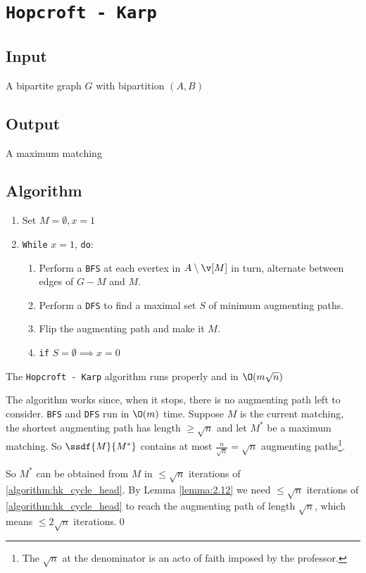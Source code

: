 \section{\texttt{Hopcroft - Karp}}
\subsection{Input}
    A bipartite graph $G$ with bipartition $(A, B)$
\subsection{Output}
    A maximum matching
\subsection{Algorithm}
\begin{enumerate}
    \item Set $M = \emptyset, x = 1$
    \item \label{algorithm:hk_cycle_head}\texttt{While} $x = 1$, \texttt{do}:
    \begin{enumerate}[label = \Alph*]
        \item Perform a \texttt{BFS} at each evertex in $A \setminus \v[M]$ in turn, alternate between edges of $G - M$ and $M$.
        \item Perform a \texttt{DFS} to find a maximal set $S$ of minimum augmenting paths.
        \item Flip the augmenting path and make it $M$.
        \item \texttt{if} $S = \emptyset \implies x = 0$
    \end{enumerate}
\end{enumerate}
\begin{customlemma}{2.13}
\label{lemma:2.13}
    The \texttt{Hopcroft - Karp} algorithm runs properly and in $\O(m\sqrt{n})$
\end{customlemma}
\begin{prf}
    The algorithm works since, when it stops, there is no augmenting path left to consider. \texttt{BFS} and \texttt{DFS} run in $\O(m)$ time. Suppose $M$ is the current matching, the shortest augmenting path has length $\geq \sqrt{n}$ and let $M^*$ be a maximum matching. So $\ssdf{M}{M^*}$ contains at most $\frac{n}{\sqrt{n}} = \sqrt{n}$ augmenting paths\footnote{The $\sqrt{n}$ at the denominator is an acto of faith imposed by the professor.}.

    So $M^*$ can be obtained from $M$ in $\leq \sqrt{n}$ iterations of \ref{algorithm:hk_cycle_head}. By Lemma \ref{lemma:2.12} we need $\leq \sqrt{n}$ iterations of \ref{algorithm:hk_cycle_head} to reach the augmenting path of length $\sqrt{n}$, which means $\leq 2\sqrt{n}$ iterations.\qed
\end{prf}